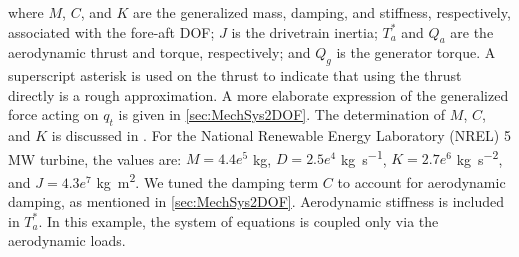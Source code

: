 \documentclass[wes, manuscript]{copernicus}
\begin{document}
where $M$, $C$, and $K$ are the generalized mass, damping, and stiffness, respectively, associated with the fore-aft DOF; $J$ is the drivetrain inertia; $T_a^*$ and $Q_a$ are the aerodynamic thrust and torque, respectively; and $Q_g$ is the generator torque. 
A superscript asterisk is used on the thrust to indicate that using the thrust directly is a rough approximation. A more elaborate expression of the generalized force acting on $q_t$ is given in \autoref{sec:MechSys2DOF}.
The determination of $M$, $C$, and $K$ is discussed in \cite{branlard:2019flex}. 
For the National Renewable Energy Laboratory (NREL) 5 MW turbine, the values are: $M=4.4e^5$ \unit{kg}, $D=2.5e^4$ \unit{kg~s^{-1}}, $K=2.7e^6$ \unit{kg~s^{-2}}, and $J=4.3e^7$ \unit{kg~m^2}.
We tuned the damping term $C$ to account for aerodynamic damping, as mentioned in \autoref{sec:MechSys2DOF}. Aerodynamic stiffness is included in $T_a^*$.
In this example, the system of equations is coupled only via the aerodynamic loads.
\end{document}
